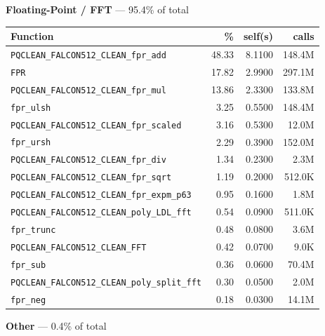 \documentclass[11pt,a4paper]{article}
\begin{document}
\noindent\colorbox{fpcolor}{\strut \textbf{Floating-Point / FFT} --- 95.4\% of total}
\vspace{2pt}

\begin{longtable}{p{7.5cm}rrr}
\toprule
Function & \% & self(s) & calls \\
\midrule
\endhead
  \texttt{PQCLEAN\_FALCON512\_CLEAN\_fpr\_add} & 48.33 & 8.1100 & 148.4M \\
  \texttt{FPR} & 17.82 & 2.9900 & 297.1M \\
  \texttt{PQCLEAN\_FALCON512\_CLEAN\_fpr\_mul} & 13.86 & 2.3300 & 133.8M \\
  \texttt{fpr\_ulsh} & 3.25 & 0.5500 & 148.4M \\
  \texttt{PQCLEAN\_FALCON512\_CLEAN\_fpr\_scaled} & 3.16 & 0.5300 & 12.0M \\
  \texttt{fpr\_ursh} & 2.29 & 0.3900 & 152.0M \\
  \texttt{PQCLEAN\_FALCON512\_CLEAN\_fpr\_div} & 1.34 & 0.2300 & 2.3M \\
  \texttt{PQCLEAN\_FALCON512\_CLEAN\_fpr\_sqrt} & 1.19 & 0.2000 & 512.0K \\
  \texttt{PQCLEAN\_FALCON512\_CLEAN\_fpr\_expm\_p63} & 0.95 & 0.1600 & 1.8M \\
  \texttt{PQCLEAN\_FALCON512\_CLEAN\_poly\_LDL\_fft} & 0.54 & 0.0900 & 511.0K \\
  \texttt{fpr\_trunc} & 0.48 & 0.0800 & 3.6M \\
  \texttt{PQCLEAN\_FALCON512\_CLEAN\_FFT} & 0.42 & 0.0700 & 9.0K \\
  \texttt{fpr\_sub} & 0.36 & 0.0600 & 70.4M \\
  \texttt{PQCLEAN\_FALCON512\_CLEAN\_poly\_split\_fft} & 0.30 & 0.0500 & 2.0M \\
  \texttt{fpr\_neg} & 0.18 & 0.0300 & 14.1M \\
\bottomrule
\end{longtable}

\noindent\colorbox{othercolor}{\strut \textbf{Other} --- 0.4\% of total}
\vspace{2pt}
\end{document}
